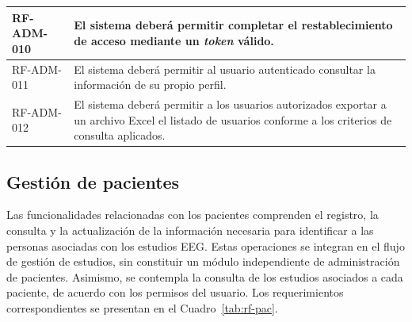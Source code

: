 \begin{longtable}{|p{}|p{}|}
    RF-ADM-010 &
    El sistema deberá permitir completar el restablecimiento de acceso mediante
    un \textit{token} válido. \\
    \hline

    RF-ADM-011 &
    El sistema deberá permitir al usuario autenticado consultar la información
    de su propio perfil. \\
    \hline

    RF-ADM-012 &
    El sistema deberá permitir a los usuarios autorizados exportar a un archivo
    Excel el listado de usuarios conforme a los criterios de consulta aplicados. \\
    \hline
\end{longtable}

\subsection{Gestión de pacientes}
\label{subsec:rf-pacientes}

Las funcionalidades relacionadas con los pacientes comprenden el registro, la consulta y la actualización de la información necesaria para identificar a las personas asociadas con los estudios EEG. Estas operaciones se integran en el flujo de gestión de estudios, sin constituir un módulo independiente de administración de pacientes. Asimismo, se contempla la consulta de los estudios asociados a cada paciente, de acuerdo con los permisos del usuario. Los requerimientos correspondientes se
presentan en el Cuadro~\ref{tab:rf-pac}.

